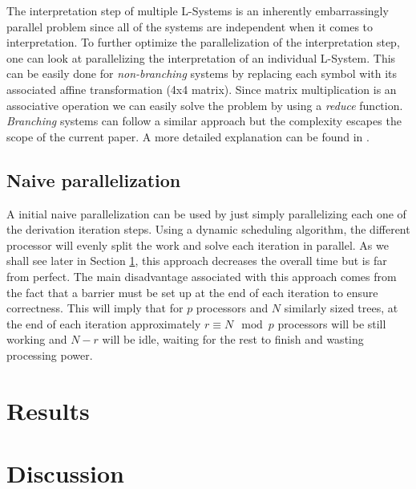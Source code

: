 \documentclass[letterpaper,twoside,11pt]{article}
\begin{document}
\begin{multicols}{2}
The interpretation step of multiple L-Systems is an inherently embarrassingly parallel problem since all of the systems are independent when it comes to interpretation. To further optimize the parallelization of the interpretation step, one can look at parallelizing the interpretation of an individual L-System. This can be easily done for \emph{non-branching} systems by replacing each symbol with its associated affine transformation (4x4 matrix). Since matrix multiplication is an associative operation we can easily solve the problem by using a \emph{reduce} function. \emph{Branching} systems can follow a similar approach but the complexity escapes the scope of the current paper. A more  detailed explanation can be found in \cite{LIPP-2010-PGMS}.

\subsection{Naive parallelization} %
\label{sub:naive_parallelization}

A initial naive parallelization can be used by just simply parallelizing each one of the derivation iteration steps. Using a dynamic scheduling algorithm, the different processor will evenly split the work and solve each iteration in parallel. As we shall see later in Section \ref{sec:results}, this approach decreases the overall time but is far from perfect. The main disadvantage associated with this approach comes from the fact that a barrier must be set up at the end of each iteration to ensure correctness. This will imply that for $p$ processors and $N$ similarly sized trees, at the end of each iteration approximately $r \equiv N \mod p$ processors will be still working and $N - r$ will be idle, waiting for the rest to finish and wasting processing power.



\section{Results} %
\label{sec:results}


\section{Discussion} %
\label{sec:discussion}


\end{multicols}
\end{document}
